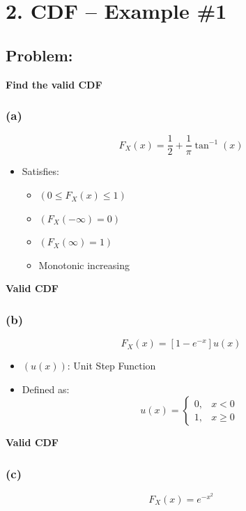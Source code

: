 \documentclass[12pt]{article}
\begin{document}
\section*{2. CDF -- Example \#1}

\subsection*{Problem:}

\textbf{Find the valid CDF}

\subsubsection*{(a)}

\[
F_X(x) = \frac{1}{2} + \frac{1}{\pi}\tan^{-1}(x)
\]

\begin{itemize}
\item Satisfies:
\begin{itemize}
\item $(0 \le F_X(x) \le 1)$
\item $(F_X(-\infty) = 0)$
\item $(F_X(\infty) = 1)$
\item Monotonic increasing
\end{itemize}
\end{itemize}

\textbf{Valid CDF}

\subsubsection*{(b)}

\[
F_X(x) = \left[1 - e^{-x}\right]u(x)
\]

\begin{itemize}
\item $(u(x))$: Unit Step Function
\item Defined as:
\[
u(x) =
\begin{cases}
0, & x < 0 \\
1, & x \ge 0
\end{cases}
\]
\end{itemize}

\textbf{Valid CDF}

\subsubsection*{(c)}

\[
F_X(x) = e^{-x^2}
\]
\end{document}
